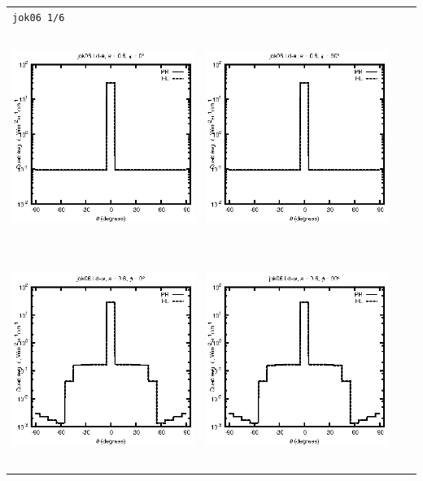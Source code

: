 \documentclass[10pt,a4paper]{article}
\begin{document}
\begin{adjustwidth}{-1.2in}{-1.2in}
\begin{tabular}{c c c c}
\multicolumn{4}{l}{\texttt{jok06 1/6}} \\
\includegraphics[height=7cm]{../eps/jok06_Ld_a_fwd.eps} &
\includegraphics[height=7cm]{../eps/jok06_Ld_a_cross.eps}\\
\includegraphics[height=7cm]{../eps/jok06_Ld_w_fwd.eps} &
\includegraphics[height=7cm]{../eps/jok06_Ld_w_cross.eps} \\

\end{tabular}
\end{adjustwidth}
\end{document}
